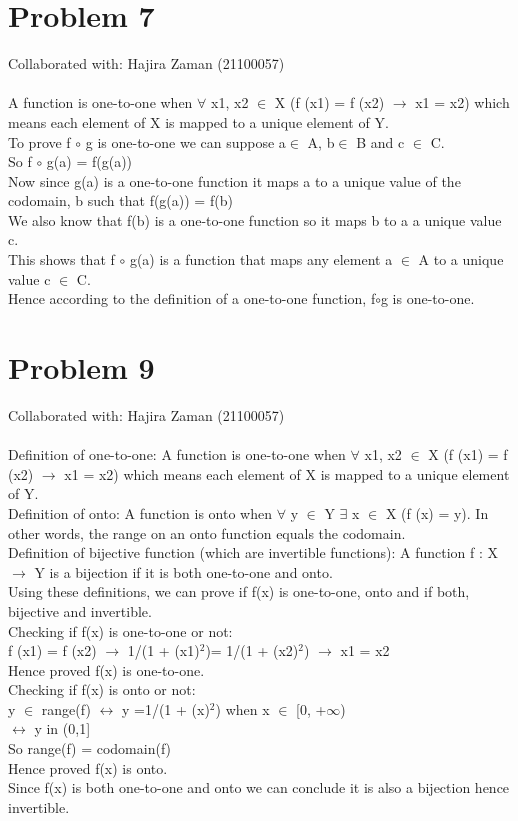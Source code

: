 \documentclass{article}
\begin{document}
\section{Problem 7}
Collaborated with: Hajira Zaman (21100057)\\\\
A function is one-to-one when $\forall$ x1, x2 $\in$ X (f (x1) = f (x2) $\rightarrow$ x1 = x2) which means each element of X is mapped to a unique element of Y. \\
To prove f $\circ$ g is one-to-one we can suppose a$\in$ A, b$\in$ B and c $\in$ C. \\
So f $\circ$ g(a) = f(g(a)) \\
Now since g(a) is a one-to-one function it maps a to a unique value of the codomain, b such that f(g(a)) = f(b) \\
We also know that f(b) is a one-to-one function so it maps b to a a unique value c. \\
This shows that f $\circ$ g(a) is a function that maps any element a $\in$ A to a unique value c $\in$ C. \\
Hence according to the definition of a one-to-one function, f$\circ$g is one-to-one.


\section{Problem 9}
Collaborated with: Hajira Zaman (21100057) \\\\
Definition of one-to-one: A function is one-to-one when $\forall$ x1, x2 $\in$ X (f (x1) = f (x2) $\rightarrow$ x1 = x2) which means each element of X is mapped to a unique element of Y. \\
Definition of onto: A function is onto when $\forall$ y $\in$ Y $\exists$ x $\in$ X (f (x) = y). In other words, the range on an onto function equals the codomain. \\
Definition of bijective function (which are invertible functions): A function f : X $\rightarrow$ Y is a bijection if it is both one-to-one and onto. \\
Using these definitions, we can prove if f(x) is one-to-one, onto and if both, bijective and invertible. \\
Checking if f(x) is one-to-one or not: \\
f (x1) = f (x2) $\rightarrow$ 1/(1 + (x1)$^2$)= 1/(1 + (x2)$^2$) $\rightarrow$ x1 = x2 \\
Hence proved f(x) is one-to-one. \\ Checking if f(x) is onto or not: \\
y $\in$ range(f) $\leftrightarrow$ y =1/(1 + (x)$^2$) when x $\in$ [0, +$\infty$) \\ $\leftrightarrow$ y in (0,1] \\So range(f) = codomain(f)\\ Hence proved f(x) is onto. \\
Since f(x) is both one-to-one and onto we can conclude it is also a bijection hence invertible. \\
\end{document}
